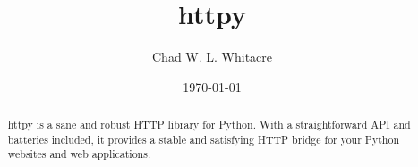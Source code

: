 \documentclass{manual}
\title{httpy}
\author{Chad W. L. Whitacre}
\date\today
\begin{document}
\maketitle

\begin{abstract}

\noindent
httpy is a sane and robust HTTP library for Python. With a straightforward API
and batteries included, it provides a stable and satisfying HTTP bridge for your
Python websites and web applications.

\end{abstract}











%
%
%
\renewcommand{\indexname}{Module Index}

\renewcommand{\indexname}{Index}
\end{document}
